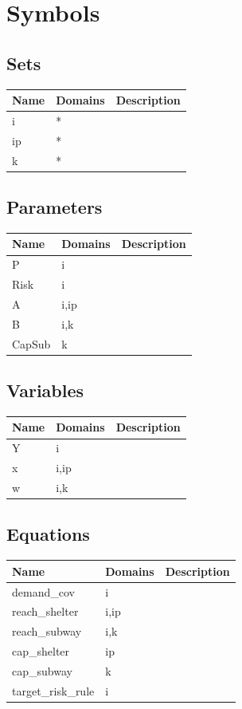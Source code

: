\documentclass[11pt]{article}
\begin{document}
\section*{Symbols}


\subsection*{Sets}
\begin{tabularx}{\textwidth}{| l | l | X |}
\hline
\textbf{Name} & \textbf{Domains} & \textbf{Description}\\
\hline
\endhead

i & * & \\
ip & * & \\
k & * & \\
\hline
\end{tabularx}
\subsection*{Parameters}
\begin{tabularx}{\textwidth}{| l | l | X |}
\hline
\textbf{Name} & \textbf{Domains} & \textbf{Description}\\
\hline
\endhead

P & i & \\
Risk & i & \\
A & i,ip & \\
B & i,k & \\
CapSub & k & \\
\hline
\end{tabularx}
\subsection*{Variables}
\begin{tabularx}{\textwidth}{| l | l | X |}
\hline
\textbf{Name} & \textbf{Domains} & \textbf{Description}\\
\hline
\endhead

Y & i & \\
x & i,ip & \\
w & i,k & \\
\hline
\end{tabularx}
\subsection*{Equations}
\begin{tabularx}{\textwidth}{| l | l | X |}
\hline
\textbf{Name} & \textbf{Domains} & \textbf{Description}\\
\hline
\endhead

demand\_cov & i & \\
reach\_shelter & i,ip & \\
reach\_subway & i,k & \\
cap\_shelter & ip & \\
cap\_subway & k & \\
target\_risk\_rule & i & \\
\hline
\end{tabularx}
\vspace{20pt}
\end{document}
